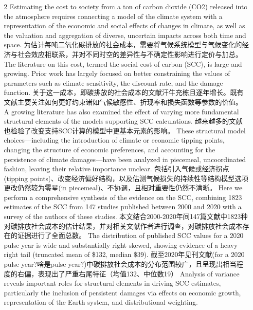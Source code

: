 \documentclass[cn,hazy,blue,14pt,screen]{elegantnote}
\begin{document}
\begin{paracol}{2}
	Estimating the cost to society from a ton of carbon dioxide (CO2) released into the atmosphere requires connecting a model of the climate system with a representation of the economic and social effects of changes in climate, as well as the valuation and aggregation of diverse, uncertain impacts across both time and space. 
	\switchcolumn
	为估计每吨二氧化碳排放的社会成本，需要将气候系统模型与气候变化的经济与社会效应相联系，并对不同时空的差异性与不确定性影响进行定价与加总。
	\switchcolumn*
	The literature on this cost, termed the social cost of carbon (SCC), is large and growing. Prior work has largely focused on better constraining the values of parameters such as climate sensitivity, the discount rate, and the damage function. 
		\switchcolumn
	关于这一成本，即碳排放的社会成本的文献汗牛充栋且逐年增长。既有文献主要关注如何更好约束诸如气候敏感性、折现率和损失函数等参数的价值。
	\switchcolumn*
	A growing literature has also examined the effect of varying more fundamental structural elements of the models supporting SCC calculations. 	
	\switchcolumn
	越来越多的文献也检验了改变支持SCC计算的模型中更基本元素的影响。
	\switchcolumn*
	These structural model choices—including the introduction of climate or economic tipping points, changing the structure of economic preferences, and accounting for the persistence of climate damages—have been analyzed in piecemeal, uncoordinated fashion, leaving their relative importance unclear. 
		\switchcolumn
	包括引入气候或经济拐点(tipping points)、改变经济偏好结构，以及估测气候损失的持续性等结构模型选项更改仍然较为零星(in piecemeal)、不协调，且相对重要性仍然不清晰。
	\switchcolumn*
	Here we perform a comprehensive synthesis of the evidence on the SCC, combining 1823 estimates of the SCC from 147 studies published between 2000 and 2020 with a survey of the authors of these studies. 
		\switchcolumn
	本文结合2000-2020年间147篇文献中1823种对碳排放社会成本的估计结果，并对相关文献作者进行调查，对碳排放社会成本存在的证据进行了全面总数。
	\switchcolumn*
	The distribution of published SCC values for a 2020 pulse year is wide and substantially right-skewed, showing evidence of a heavy right tail (truncated mean of \$132, median \$39). 
	\switchcolumn
	截至2020年见刊文献(for a 2020 pulse year?啥是pulse year?)中碳排放社会成本的分布范围较广，且呈现出相当程度的右偏，表现出了严重右尾特征（均值132、中位数19）
	\switchcolumn*
	Analysis of variance reveals important roles for structural elements in driving SCC estimates, particularly the inclusion of persistent damages via effects on economic growth, representation of the Earth system, and distributional weighting. 

\end{paracol}
\end{document}
